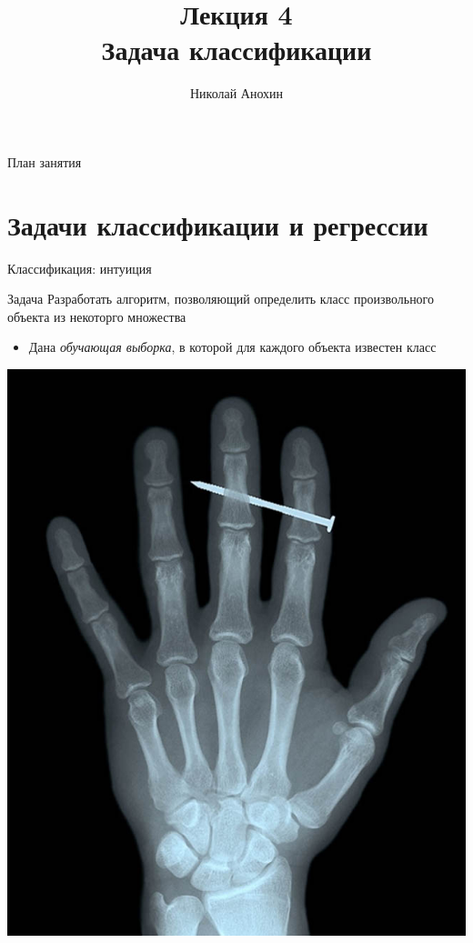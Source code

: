 \documentclass[10pt]{beamer}
\author{Николай Анохин}
\title{\newline \newline \newline Лекция 4 \\ Задача классификации}
\let\otp\titlepage
\renewcommand{\titlepage}{\otp\addtocounter{framenumber}{-1}}
\begin{document}
\begin{frame}[plain]
\titlepage
\end{frame}

\begin{frame}{План занятия}
\tableofcontents
\end{frame}

\section{Задачи классификации и регрессии}

\begin{frame}{Классификация: интуиция}

\begin{block}{Задача}
Разработать алгоритм, позволяющий определить класс произвольного объекта из некоторго множества
\begin{itemize}
\item Дана {\it обучающая выборка}, в которой для каждого объекта известен класс
\end{itemize}
\end{block} 

\begin{center}
\includegraphics[scale=0.15]{images/xray.jpg}
\end{center}

\end{frame}
\end{document}
